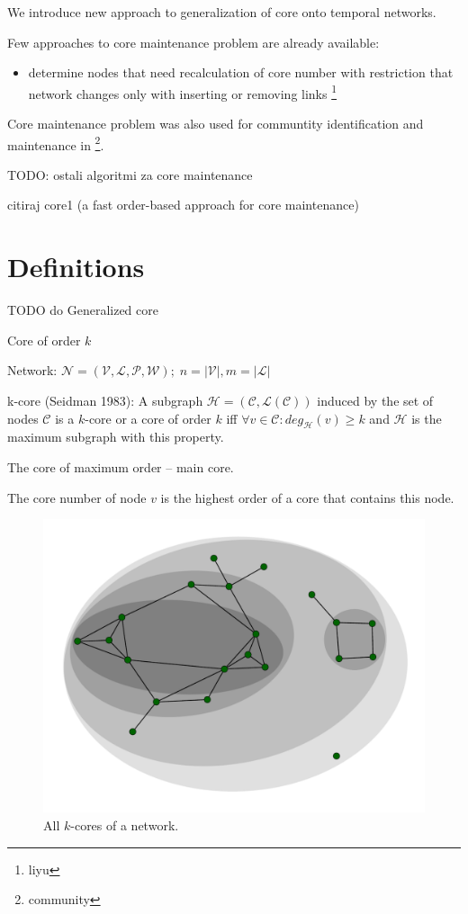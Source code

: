 \documentclass[a4paper,twoside,10pt]{article}
\newcommand{\C}{\mathcal{C}}
\begin{document}
We introduce new approach to generalization of core onto temporal networks. 

Few approaches to core maintenance problem are already available:
\begin{itemize}
\item determine nodes that need recalculation of core number with restriction that network changes only with inserting or removing links \footnote{liyu}
\end{itemize}

Core maintenance problem was also used for communtity identification and maintenance in \footnote{community}.


TODO: ostali algoritmi za core maintenance

citiraj core1 (a fast order-based approach for core maintenance)


%
%
\section{Definitions}\label{definitions}
TODO do Generalized core

Core of order $k$

Network: 
$
\mathcal{N} = (\mathcal{V}, \mathcal{L}, \mathcal{P}, \mathcal{W}); \; n = |\mathcal{V}|, m = |\mathcal{L}|$

k-core (Seidman 1983): 
A subgraph $\mathcal{H} = (\C,\mathcal{L}(\C))$ induced by the
set of nodes $\C$ is a $k$-core or a core of order $k$ iff $\forall v \in \C : deg_\mathcal{H}(v) \geq k$ and $\mathcal{H}$ is the maximum
subgraph with this property.


The core of maximum order -- main core.

The core number of node $v$ is the highest order of a core that contains this node.

\begin{figure}[!h]
	\centering
  \includegraphics[width=\textwidth]{./pics/kcore.pdf}
  \caption{All $k$-cores of a network.}
  \label{kcore}
\end{figure}
\end{document}
